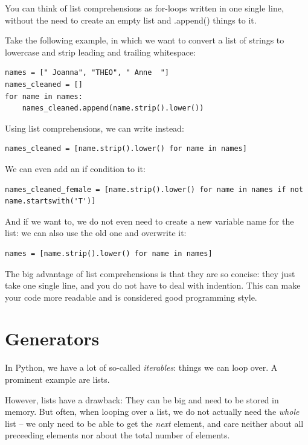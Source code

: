 \documentclass[a4paper,12pt]{book}
\begin{document}
\begin{appendices}
You can think of list comprehensions as for-loops written in one single line, without the need to create an empty list and .append() things to it.

Take the following example, in which we want to convert a list of strings to lowercase and strip leading and trailing whitespace:

\begin{lstlisting}
names = [" Joanna", "THEO", " Anne  "]
names_cleaned = []
for name in names:
    names_cleaned.append(name.strip().lower())
\end{lstlisting}

Using list comprehensions, we can write instead:
\begin{lstlisting}
names_cleaned = [name.strip().lower() for name in names]
\end{lstlisting}

We can even add an if condition to it:

\begin{lstlisting}
names_cleaned_female = [name.strip().lower() for name in names if not name.startswith('T')]
\end{lstlisting}

And if we want to, we do not even need to create a new variable name for the list: we can also use the old one and overwrite it:

\begin{lstlisting}
names = [name.strip().lower() for name in names]
\end{lstlisting}

The big advantage of list comprehensions is that they are so concise: they just take one single line, and you do not have to deal with indention. This can make your code more readable and is considered good programming style.



\section{Generators}
\label{sec:generators}
In Python, we have a lot of so-called \emph{iterables}: things we can loop over. A prominent example are lists.

However, lists have a drawback: They can be big and need to be stored in memory. But often, when looping over a list, we do not actually need the \emph{whole} list -- we only need to be able to get the \emph{next} element, and care neither about all preceeding elements nor about the total number of elements.


\end{appendices}
\end{document}
